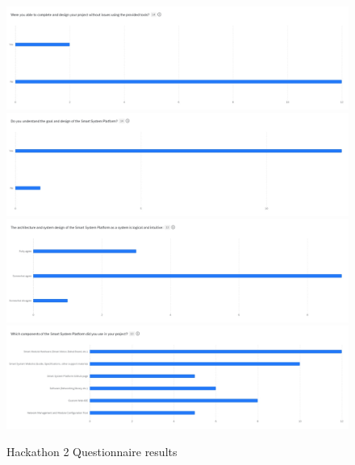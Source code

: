 \begin{figure}[H]
    \centering
    \includegraphics[width=\linewidth]{overleaf/images/completion.jpg}
    \includegraphics[width=\linewidth]{overleaf/images/ssp_goal.jpg}
    \includegraphics[width=\linewidth]{overleaf/images/ssp_architecture.jpg}
    \includegraphics[width=\linewidth]{overleaf/images/tool_use.jpg}
    \vspace{\ftspace}
    \caption{Hackathon 2 Questionnaire results}
    \vspace{\ftspace}
    \label{fig:hack2_questions}
\end{figure}

